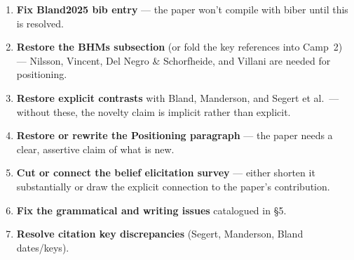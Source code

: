 \documentclass[12pt,a4paper]{article}
\begin{document}
\begin{enumerate}[leftmargin=1.5em]
  \item \textbf{Fix Bland2025 bib entry} --- the paper won't compile with
    biber until this is resolved.
  \item \textbf{Restore the BHMs subsection} (or fold the key references into
    Camp~2) --- Nilsson, Vincent, Del Negro \& Schorfheide, and Villani are
    needed for positioning.
  \item \textbf{Restore explicit contrasts} with Bland, Manderson, and Segert
    et al.\ --- without these, the novelty claim is implicit rather than
    explicit.
  \item \textbf{Restore or rewrite the Positioning paragraph} --- the paper
    needs a clear, assertive claim of what is new.
  \item \textbf{Cut or connect the belief elicitation survey} --- either
    shorten it substantially or draw the explicit connection to the paper's
    contribution.
  \item \textbf{Fix the grammatical and writing issues} catalogued in \S5.
  \item \textbf{Resolve citation key discrepancies} (Segert, Manderson, Bland
    dates/keys).
\end{enumerate}
\end{document}
